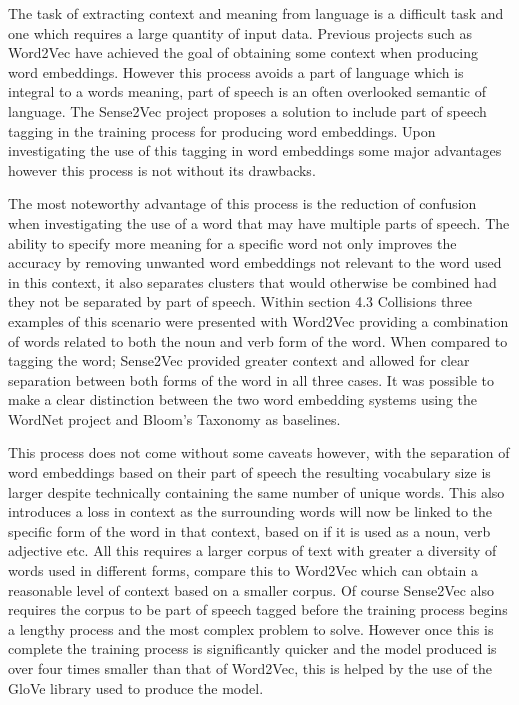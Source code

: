 The task of extracting context and meaning from language is a difficult task and one which requires a large quantity of input data. Previous projects such as Word2Vec have achieved the goal of obtaining some context when producing word embeddings. However this process avoids a part of language which is integral to a words meaning, part of speech is an often overlooked semantic of language. The Sense2Vec project proposes a solution to include part of speech tagging in the training process for producing word embeddings. Upon investigating the use of this tagging in word embeddings some major advantages however this process is not without its drawbacks.

The most noteworthy advantage of this process is the reduction of confusion when investigating the use of a word that may have multiple parts of speech. The ability to specify more meaning for a specific word not only improves the accuracy by removing unwanted word embeddings not relevant to the word used in this context, it also separates clusters that would otherwise be combined had they not be separated by part of speech. Within section 4.3 Collisions three examples of this scenario were presented with Word2Vec providing a combination of words related to both the noun and verb form of the word. When compared to tagging the word; Sense2Vec provided greater context and allowed for clear separation between both forms of the word in all three cases. It was possible to make a clear distinction between the two word embedding systems using the WordNet project and Bloom's Taxonomy as baselines.

This process does not come without some caveats however, with the separation of word embeddings based on their part of speech the resulting vocabulary size is larger despite technically containing the same number of unique words. This also introduces a loss in context as the surrounding words will now be linked to the specific form of the word in that context, based on if it is used as a noun, verb adjective etc. All this requires a larger corpus of text with greater a diversity of words used in different forms, compare this to Word2Vec which can obtain a reasonable level of context based on a smaller corpus. Of course Sense2Vec also requires the corpus to be part of speech tagged before the training process begins a lengthy process and the most complex problem to solve. However once this is complete the training process is significantly quicker and the model produced is over four times smaller than that of Word2Vec, this is helped by the use of the GloVe library used to produce the model.

